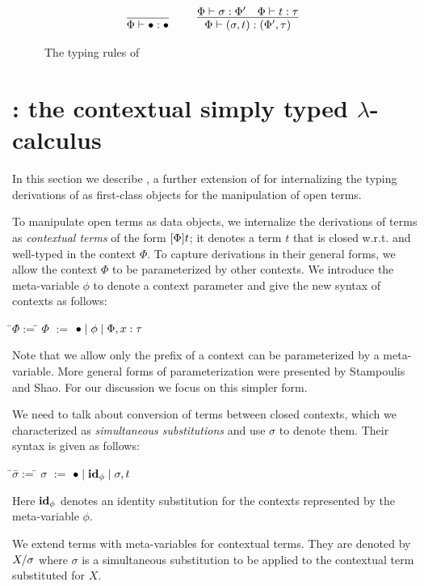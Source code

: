 \documentclass[10pt]{article}
\begin{document}
\begin{figure}[ht!]
\\
\begin{gather*}
  \infer[]{
    \tyof{\Phi}{\bullet}{\bullet}
  }{}
  \qquad
  \infer[]{
    \tyof{\Phi}{(\si,t)}{(\Phi',\tau)}
  }{
    \tyof{\Phi}{\si}{\Phi'}
    &
    \tyof{\Phi}{t}{\tau}
  }
\end{gather*}

  
\caption{The typing rules of \STLCD}
\label{fig:stlcd-typing-rules}
\end{figure}



\section{\STLCC: the contextual simply typed $\lambda$-calculus}
%
In this section we describe \STLCC, a further extension of \STLCE for
internalizing the typing derivations of \STLCE as first-class objects
for the manipulation of open \STLCE terms.

To manipulate open \STLCE terms as data objects, we
internalize the derivations of \STLCE terms as \emph{contextual terms}
of the form $[{\Phi}]{t}$; it denotes a term $t$ that is closed
w.r.t. and well-typed in the context $\Phi$.
%
To capture derivations in their general forms, we allow the context
$\Phi$ to be parameterized by other contexts. We introduce the
meta-variable $\phi$ to denote a context parameter and give the new
syntax of contexts as follows:
%
\begin{tabbing}
\qquad\=$\Phi$\quad\=$:=$\quad\=\kill
\>$\Phi$  \>$:=$ \>$\bullet \; | \; \phi \; | \; \Phi, x:\tau$
\end{tabbing}
%
Note that we allow only the prefix of a context can be parameterized
by a meta-variable. More general forms of parameterization were
presented by Stampoulis and Shao\cite{stampoulis12}. For our
discussion we focus on this simpler form.

We need to talk about conversion of terms between closed contexts,
which we characterized as \emph{simultaneous substitutions} and use
$\sigma$ to denote them. Their syntax is given as follows:
%
\begin{tabbing}
\qquad\=$\sigma$\quad\=$:=$\quad\=\kill
\>$\sigma$  \>$:=$ \>$\bullet \; | \; {\bf id}_{\phi} \; | \; \sigma, t$
\end{tabbing}
%
Here ${\bf id}_{\phi}$ denotes an identity substitution for the contexts
represented by the meta-variable $\phi$.

We extend \STLCE terms with meta-variables for contextual terms. They
are denoted by $X / \sigma$ where $\sigma$ is a simultaneous
substitution to be applied to the contextual term substituted for $X$.
\end{document}
